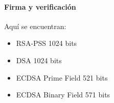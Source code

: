 \documentclass[../main.tex]{subfiles}
\begin{document}
\hypertarget{firma-y-verificacion}{%
  \paragraph{Firma y verificación}\label{firma-y-verificacion}}

Aquí se encuentran:

\begin{itemize}
        \tightlist{}
  \item
        RSA-PSS 1024 bits
  \item
        DSA 1024 bits
  \item
        ECDSA Prime Field 521 bits
  \item
        ECDSA Binary Field 571 bits
\end{itemize}
\end{document}
